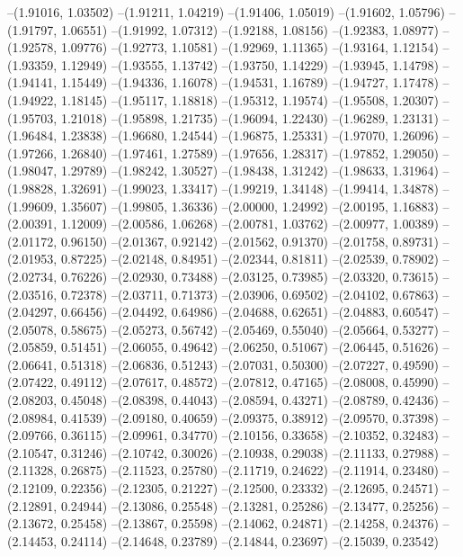 --(1.91016, 1.03502)
--(1.91211, 1.04219)
--(1.91406, 1.05019)
--(1.91602, 1.05796)
--(1.91797, 1.06551)
--(1.91992, 1.07312)
--(1.92188, 1.08156)
--(1.92383, 1.08977)
--(1.92578, 1.09776)
--(1.92773, 1.10581)
--(1.92969, 1.11365)
--(1.93164, 1.12154)
--(1.93359, 1.12949)
--(1.93555, 1.13742)
--(1.93750, 1.14229)
--(1.93945, 1.14798)
--(1.94141, 1.15449)
--(1.94336, 1.16078)
--(1.94531, 1.16789)
--(1.94727, 1.17478)
--(1.94922, 1.18145)
--(1.95117, 1.18818)
--(1.95312, 1.19574)
--(1.95508, 1.20307)
--(1.95703, 1.21018)
--(1.95898, 1.21735)
--(1.96094, 1.22430)
--(1.96289, 1.23131)
--(1.96484, 1.23838)
--(1.96680, 1.24544)
--(1.96875, 1.25331)
--(1.97070, 1.26096)
--(1.97266, 1.26840)
--(1.97461, 1.27589)
--(1.97656, 1.28317)
--(1.97852, 1.29050)
--(1.98047, 1.29789)
--(1.98242, 1.30527)
--(1.98438, 1.31242)
--(1.98633, 1.31964)
--(1.98828, 1.32691)
--(1.99023, 1.33417)
--(1.99219, 1.34148)
--(1.99414, 1.34878)
--(1.99609, 1.35607)
--(1.99805, 1.36336)
--(2.00000, 1.24992)
--(2.00195, 1.16883)
--(2.00391, 1.12009)
--(2.00586, 1.06268)
--(2.00781, 1.03762)
--(2.00977, 1.00389)
--(2.01172, 0.96150)
--(2.01367, 0.92142)
--(2.01562, 0.91370)
--(2.01758, 0.89731)
--(2.01953, 0.87225)
--(2.02148, 0.84951)
--(2.02344, 0.81811)
--(2.02539, 0.78902)
--(2.02734, 0.76226)
--(2.02930, 0.73488)
--(2.03125, 0.73985)
--(2.03320, 0.73615)
--(2.03516, 0.72378)
--(2.03711, 0.71373)
--(2.03906, 0.69502)
--(2.04102, 0.67863)
--(2.04297, 0.66456)
--(2.04492, 0.64986)
--(2.04688, 0.62651)
--(2.04883, 0.60547)
--(2.05078, 0.58675)
--(2.05273, 0.56742)
--(2.05469, 0.55040)
--(2.05664, 0.53277)
--(2.05859, 0.51451)
--(2.06055, 0.49642)
--(2.06250, 0.51067)
--(2.06445, 0.51626)
--(2.06641, 0.51318)
--(2.06836, 0.51243)
--(2.07031, 0.50300)
--(2.07227, 0.49590)
--(2.07422, 0.49112)
--(2.07617, 0.48572)
--(2.07812, 0.47165)
--(2.08008, 0.45990)
--(2.08203, 0.45048)
--(2.08398, 0.44043)
--(2.08594, 0.43271)
--(2.08789, 0.42436)
--(2.08984, 0.41539)
--(2.09180, 0.40659)
--(2.09375, 0.38912)
--(2.09570, 0.37398)
--(2.09766, 0.36115)
--(2.09961, 0.34770)
--(2.10156, 0.33658)
--(2.10352, 0.32483)
--(2.10547, 0.31246)
--(2.10742, 0.30026)
--(2.10938, 0.29038)
--(2.11133, 0.27988)
--(2.11328, 0.26875)
--(2.11523, 0.25780)
--(2.11719, 0.24622)
--(2.11914, 0.23480)
--(2.12109, 0.22356)
--(2.12305, 0.21227)
--(2.12500, 0.23332)
--(2.12695, 0.24571)
--(2.12891, 0.24944)
--(2.13086, 0.25548)
--(2.13281, 0.25286)
--(2.13477, 0.25256)
--(2.13672, 0.25458)
--(2.13867, 0.25598)
--(2.14062, 0.24871)
--(2.14258, 0.24376)
--(2.14453, 0.24114)
--(2.14648, 0.23789)
--(2.14844, 0.23697)
--(2.15039, 0.23542)
